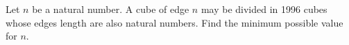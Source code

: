 Let $ n$ be a natural number. A cube of edge $ n$ may be divided in 1996 cubes whose edges length are also natural numbers. Find the minimum possible value for $ n$.